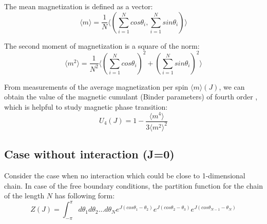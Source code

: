 The mean magnetization is defined as a vector:
\begin{equation}
\label{meanmagnetization}
\langle m \rangle = \frac{1}{N} \langle ( \sum_{i=1}^{N} cos \theta_i, \sum_{i=1}^{N} sin \theta_i  ) \rangle
\end{equation}

The second moment of magnetization is a square of the norm:
\begin{equation}
\label{secondmomentmagnetization}
\langle m^2 \rangle = \frac{1}{N^2} \langle ( \sum_{i=1}^{N} cos \theta_i )^2 +  (\sum_{i=1}^{N} sin \theta_i  )^2 \rangle
\end{equation}

From measurements of the average magnetization per spin $\langle m \rangle (J)$, we can obtain the value of the magnetic cumulant  (Binder parameters) of fourth order \cite{Binder2010}, which is helpful to study magnetic phase transition:
\begin{equation}
\label{binderqum}
U_4 (J) = 1 - \frac{ \langle m^4 \rangle}{3 \langle m^2 \rangle^2  }
\end{equation}

\subsection{Case without interaction (J=0)}

Consider the case when no interaction which could be close to 1-dimensional chain. In case of the free boundary conditions, the partition function for the chain of the length $N$ has following form:  
\begin{equation}
\label{partitionfunction_free}
Z(J) =    \int_{-\pi}^{\pi} d \theta_1 d \theta_2 \dots d\theta_N
e ^{J(cos\theta_1-\theta_2)} e ^{J(cos\theta_2-\theta_3)} 
e ^{J(cos\theta_{N-1}-\theta_N)} %
\end{equation}

